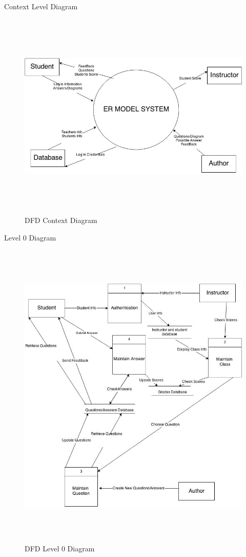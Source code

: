 \documentclass{article}
\begin{document}
\newpage
\iffalse
\begin{section}{Context Level Diagram}
    \begin{figure}[h!]
        \begin{center}
           \centerline{ \includegraphics[height=10cm]{ContextDiagram.jpg}}
            \caption{DFD Context Diagram}
        \end{center}
    \end{figure}
\end{section}
\newpage
\begin{section}{Level 0 Diagram}
    \begin{figure}[h!]
        \begin{center}
            \centerline{\includegraphics[height=15cm]{DFDLevel0.jpg}}
            \caption{DFD Level 0 Diagram}
        \end{center}
    \end{figure}
\end{section}
\newpage
\end{document}
